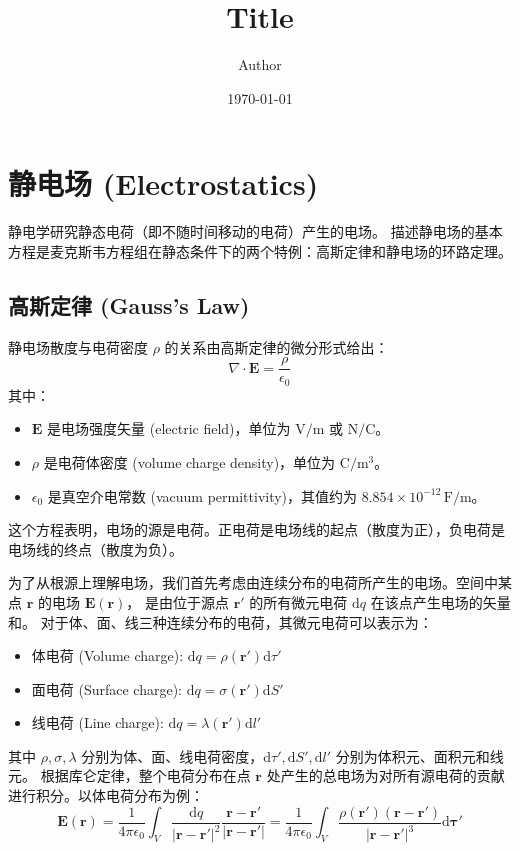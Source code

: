 \documentclass[fontset=none]{ctexart}
\title{Title}
\author{Author}
\date{\today}
\begin{document}

\section{静电场 (Electrostatics)}
静电学研究静态电荷（即不随时间移动的电荷）产生的电场。
描述静电场的基本方程是麦克斯韦方程组在静态条件下的两个特例：高斯定律和静电场的环路定理。

\subsection{高斯定律 (Gauss's Law)}
\begin{law}
    静电场散度与电荷密度 $\rho$ 的关系由高斯定律的微分形式给出：
    \begin{equation}
        \nabla \cdot \bm{E} = \frac{\rho}{\epsilon_0}
    \end{equation}
    其中：
    \begin{itemize}
        \item $\bm{E}$ 是电场强度矢量 (electric field)，单位为 $\mathrm{V/m}$ 或 $\mathrm{N/C}$。
        \item $\rho$ 是电荷体密度 (volume charge density)，单位为 $\mathrm{C/m^3}$。
        \item $\epsilon_0$ 是真空介电常数 (vacuum permittivity)，其值约为 $8.854 \times 10^{-12} \, 
        \mathrm{F/m}$。
    \end{itemize}
    这个方程表明，电场的源是电荷。正电荷是电场线的起点（散度为正），负电荷是电场线的终点（散度为负）。
\end{law}

为了从根源上理解电场，我们首先考虑由连续分布的电荷所产生的电场。空间中某点 $\bm{r}$ 的电场 $\bm{E}(\bm{r})$，
是由位于源点 $\bm{r'}$ 的所有微元电荷 $\mathrm{d}q$ 在该点产生电场的矢量和。
对于体、面、线三种连续分布的电荷，其微元电荷可以表示为：
\begin{itemize}
    \item 体电荷 (Volume charge): $\mathrm{d}q = \rho(\bm{r'}) \mathrm{d}\tau'$
    \item 面电荷 (Surface charge): $\mathrm{d}q = \sigma(\bm{r'}) \mathrm{d}S'$
    \item 线电荷 (Line charge): $\mathrm{d}q = \lambda(\bm{r'}) \mathrm{d}l'$
\end{itemize}
其中 $\rho, \sigma, \lambda$ 分别为体、面、线电荷密度，$\mathrm{d}\tau', \mathrm{d}S', 
\mathrm{d}l'$ 分别为体积元、面积元和线元。
根据库仑定律，整个电荷分布在点 $\bm{r}$ 处产生的总电场为对所有源电荷的贡献进行积分。以体电荷分布为例：
\begin{equation}
    \bm{E}(\bm{r}) = \frac{1}{4\pi\epsilon_0} \int_V \frac{\mathrm{d}q}{|\bm{r}-\bm{r'}|^2} 
    \frac{\bm{r}-\bm{r'}}{|\bm{r}-\bm{r'}|} = \frac{1}{4\pi\epsilon_0} 
    \int_V \frac{\rho(\bm{r'})(\bm{r}-\bm{r'})}{|\bm{r}-\bm{r'}|^3} \mathrm{d}\bm{\tau'}
\end{equation}
\end{document}
